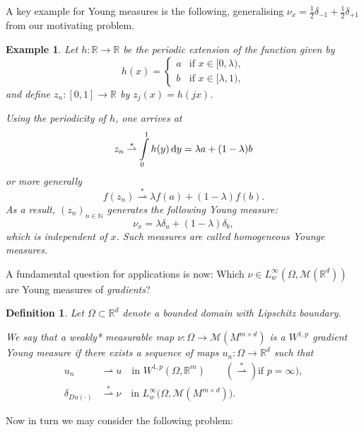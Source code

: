 \documentclass[a4paper,doc,11pt]{article}
\newtheorem{definition}[theorem]{Definition}
\newtheorem{example}[theorem]{Example}
\newcommand{\R}{\mathbb{R}}
\newcommand{\N}{\mathbb{N}}
\begin{document}
A key example for Young measures is the following, generalising \(\nu_x = \frac{1}{2} \delta_{-1} + \frac{1}{2} \delta_{+1}\) from our motivating problem.


\begin{example}
    Let \(h : \R \to \R\) be the periodic extension of the function given by
    \[
        h(x) = 
        \begin{cases}
            a & \text{if }x \in [0,\lambda),
            \\
            b & \text{if }x \in [\lambda,1),
        \end{cases}
    \]
    and define \(z_n : [0,1] \to \R\) by \( z_j(x) = h(jx)\). 
    
    Using the periodicity of \(h\), one arrives at
    \[
        z_n \overset{*}{\rightharpoonup} \int\limits_0^1 h(y) \dif y = \lambda a + (1-\lambda) b 
    \]
    or more generally 
    \[
        f(z_n) \overset{*}{\rightharpoonup} \lambda f(a) + (1-\lambda) f(b).
    \]
    As a result, \((z_n)_{n\in\N}\) generates the following Young measure:
    \[
        \nu_x = \lambda \delta_a + (1-\lambda) \delta_b,
    \]
    which is independent of \(x\). Such measures are called \emph{homogeneous Younge measures}.
\end{example}



A fundamental question for applications is now: Which \(\nu \in L^\infty_w (\Omega, \mathcal{M}(\R^d))\) are Young measures of \emph{gradients}?

\begin{definition}
    Let \(\Omega \subset \R^d\) denote a bounded domain with Lipschitz boundary.
    
    We say that a weakly* measurable map \(\nu: \Omega \to \mathcal{M}(M^{m\times d}) \) is a \(W^{1,p} \) gradient Young measure if there exists a sequence of maps \(u_n : \Omega \to \R^d\) such that
    \begin{align*}
        u_n &\rightharpoonup u
        \quad \text{in } W^{1,p} (\Omega, \R^m) \qquad (\overset{*}{\rightharpoonup}) \text{if } p = \infty),
        \\
        \delta_{Du(\cdot)} &\overset{*}{\rightharpoonup} \nu 
        \quad \text{in } L^\infty_w \big(\Omega, \mathcal{M}(M^{m\times d})\big).
    \end{align*}
\end{definition}

Now in turn we may consider the following problem:
\end{document}
